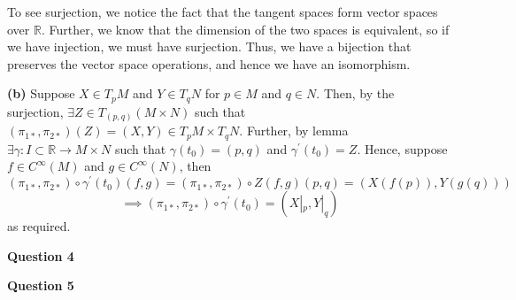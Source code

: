 \documentclass[10pt]{article}
\newcommand{\R}{\mathbb{R}}
\begin{document}
To see surjection, we notice the fact that the tangent spaces form vector spaces over $\R$. Further, we know that the dimension of the two spaces is equivalent, so if we have injection, we must have surjection. Thus, we have a bijection that preserves the vector space operations, and hence we have an isomorphism.

\textbf{(b)} Suppose $X\in T_{p}M$ and $Y\in T_{q}N$ for $p\in M$ and $q\in N$. Then, by the surjection, $\exists Z\in T_{(p,q)}(M\times N)$ such that $(\pi_{1*},\pi_{2*})(Z) = (X,Y)\in T_{p}M\times T_{q}N$. Further, by lemma $\exists \gamma: I\subset \R \to M\times N$ such that $\gamma(t_{0}) = (p,q)$ and $\gamma^{\prime}(t_{0}) = Z$. Hence, suppose $f \in C^{\infty}(M)$ and $g\in C^{\infty}(N)$, then
\[(\pi_{1*},\pi_{2*})\circ \gamma^{\prime}(t_{0})(f,g) = (\pi_{1*},\pi_{2*})\circ Z(f,g)(p,q) = (X(f(p)),Y(g(q))) \]
\[ \implies (\pi_{1*},\pi_{2*})\circ \gamma^{\prime}(t_{0}) = (X|_{p},Y|_{q}) \]
as required.

\newpage
\textbf{Question 4}

\newpage
\textbf{Question 5}
\end{document}
